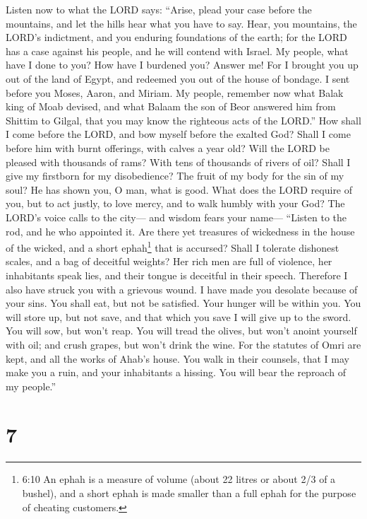  Listen now to what the LORD says: ``Arise, plead your case
before the mountains, and let the hills hear what you have to say.
 Hear, you mountains, the LORD's indictment, and you
enduring foundations of the earth; for the LORD has a case against his
people, and he will contend with Israel.  My people, what
have I done to you? How have I burdened you? Answer me!  For
I brought you up out of the land of Egypt, and redeemed you out of the
house of bondage. I sent before you Moses, Aaron, and Miriam.
 My people, remember now what Balak king of Moab devised,
and what Balaam the son of Beor answered him from Shittim to Gilgal,
that you may know the righteous acts of the LORD.''  How
shall I come before the LORD, and bow myself before the exalted God?
Shall I come before him with burnt offerings, with calves a year old?
 Will the LORD be pleased with thousands of rams? With tens
of thousands of rivers of oil? Shall I give my firstborn for my
disobedience? The fruit of my body for the sin of my soul? 
He has shown you, O man, what is good. What does the LORD require of
you, but to act justly, to love mercy, and to walk humbly with your God?
 The LORD's voice calls to the city--- and wisdom fears your
name--- ``Listen to the rod, and he who appointed it.  Are
there yet treasures of wickedness in the house of the wicked, and a
short ephah\footnote{6:10 An ephah is a measure of volume (about 22
  litres or about 2/3 of a bushel), and a short ephah is made smaller
  than a full ephah for the purpose of cheating customers.} that is
accursed?  Shall I tolerate dishonest scales, and a bag of
deceitful weights?  Her rich men are full of violence, her
inhabitants speak lies, and their tongue is deceitful in their speech.
 Therefore I also have struck you with a grievous wound. I
have made you desolate because of your sins.  You shall
eat, but not be satisfied. Your hunger will be within you. You will
store up, but not save, and that which you save I will give up to the
sword.  You will sow, but won't reap. You will tread the
olives, but won't anoint yourself with oil; and crush grapes, but won't
drink the wine.  For the statutes of Omri are kept, and all
the works of Ahab's house. You walk in their counsels, that I may make
you a ruin, and your inhabitants a hissing. You will bear the reproach
of my people.''

\hypertarget{section-5}{%
\section{7}\label{section-5}}

